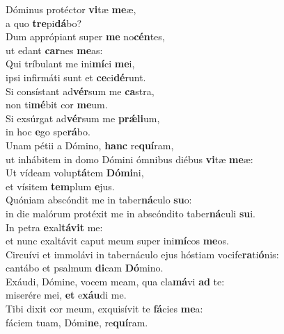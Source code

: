 \evenverse Dóminus protéctor \textbf{vi}tæ \textbf{me}æ,~\*\\
\evenverse a quo \textbf{tre}pi\textbf{dá}bo?\\
\oddverse Dum apprópiant super \textbf{me} no\textbf{cén}tes,~\*\\
\oddverse ut edant \textbf{car}nes \textbf{me}as:\\
\evenverse Qui tríbulant me ini\textbf{mí}ci \textbf{me}i,~\*\\
\evenverse ipsi infirmáti sunt et \textbf{ce}ci\textbf{dé}runt.\\
\oddverse Si consístant ad\textbf{vér}sum me \textbf{ca}stra,~\*\\
\oddverse non ti\textbf{mé}bit cor \textbf{me}um.\\
\evenverse Si exsúrgat ad\textbf{vér}sum me \textbf{prǽ}\textbf{li}um,~\*\\
\evenverse in hoc \textbf{e}go spe\textbf{rá}bo.\\
\oddverse Unam pétii a Dómino, \textbf{hanc} re\textbf{quí}ram,~\*\\
\oddverse ut inhábitem in domo Dómini ómnibus diébus \textbf{vi}tæ \textbf{me}æ:\\
\evenverse Ut vídeam volup\textbf{tá}tem \textbf{Dó}\textbf{mi}ni,~\*\\
\evenverse et vísitem \textbf{tem}plum \textbf{e}jus.\\
\oddverse Quóniam abscóndit me in taber\textbf{ná}culo \textbf{su}o:~\*\\
\oddverse in die malórum protéxit me in abscóndito taber\textbf{ná}culi \textbf{su}i.\\
\evenverse In petra \textbf{e}xal\textbf{tá}\textbf{vit} me:~\*\\
\evenverse et nunc exaltávit caput meum super ini\textbf{mí}cos \textbf{me}os.\\
\oddverse Circuívi et immolávi in tabernáculo ejus hóstiam vocife\textbf{ra}ti\textbf{ó}nis:~\*\\
\oddverse cantábo et psalmum \textbf{di}cam \textbf{Dó}mino.\\
\evenverse Exáudi, Dómine, vocem meam, qua cla\textbf{má}vi \textbf{ad} te:~\*\\
\evenverse miserére mei, \textbf{et} e\textbf{xáu}di me.\\
\oddverse Tibi dixit cor meum, exquisívit te \textbf{fá}cies \textbf{me}a:~\*\\
\oddverse fáciem tuam, Dómi\textbf{ne}, re\textbf{quí}ram.\\

